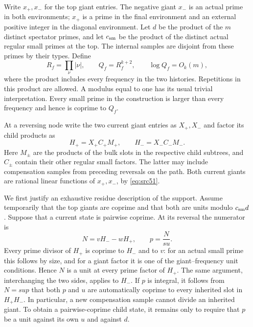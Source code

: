 Write $x_+,x_-$ for the top giant entries. The negative giant $x_-$ is an
actual prime in both environments; $x_+$ is a prime in the final environment
and an external positive integer in the diagonal environment. Let $d$ be the
product of the $m$ distinct spectator primes, and let $c_{\rm sm}$ be the
product of the distinct actual regular small primes at the top. The internal
samples are disjoint from these primes by their types. Define
\begin{equation}\label{eq:arith-frequency-modulus}
 R_f=\prod_{\nu}|\nu|,\qquad Q_f=R_f^{k+2},
 \qquad \log Q_f=O_k(m),
\end{equation}
where the product includes every frequency in the two histories. Repetitions
in this product are allowed. A modulus equal to one has its usual trivial
interpretation. Every small prime in the construction is larger than every
frequency and hence is coprime to $Q_f$.

At a reversing node write the two current giant entries as $X_+,X_-$ and
factor its child products as
\begin{equation}\label{eq:arith-child-products}
 H_+=X_+C_+M_+,\qquad H_-=X_-C_-M_-.
\end{equation}
Here $M_\pm$ are the products of the bulk slots in the respective child
subtrees, and $C_\pm$ contain their other regular small factors. The latter
may include compensation samples from preceding reversals on the path.
Both current giants are rational linear functions of $x_+,x_-$, by
\eqref{eq:src51}.

We first justify an exhaustive residue description of the support. Assume
temporarily that the top giants are coprime and that both are units modulo
$c_{\rm sm}d$. Suppose that a current state is pairwise coprime. At its
reversal the numerator is
\begin{equation}\label{eq:arith-numerator}
             N=vH_--wH_+,\qquad p=\frac{N}{su}.
\end{equation}
Every prime divisor of $H_+$ is coprime to $H_-$ and to $v$: for an actual
small prime this follows by size, and for a giant factor it is one of the
giant--frequency unit conditions. Hence $N$ is a unit at every prime factor
of $H_+$. The same argument, interchanging the two sides, applies to $H_-$.
If $p$ is integral, it follows from $N=sup$ that both $p$ and $u$ are
automatically coprime to every inherited slot in $H_+H_-$. In particular, a
new compensation sample cannot divide an inherited giant. To obtain a
pairwise-coprime child state, it remains only to require that $p$ be a unit
against its own $u$ and against $d$.

